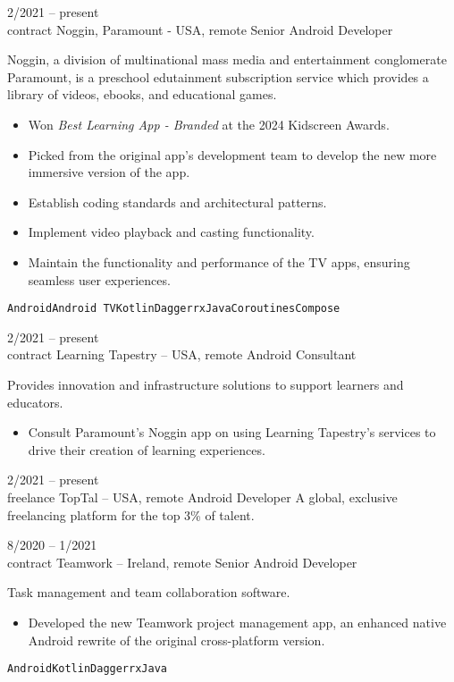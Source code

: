 \documentclass[9pt]{developercv} %
\begin{document}
\begin{entrylist}
	\entry
		{2/2021 -- present\\\footnotesize{contract}}
		{Noggin, Paramount {\normalfont\small - USA, remote}}
		{Senior Android Developer}
        {
            Noggin, a division of multinational mass media and entertainment conglomerate Paramount, is a preschool edutainment subscription service which provides a library of videos, ebooks, and educational games.
            \begin{itemize}[nosep, leftmargin=*]
                \item Won \textit{Best Learning App - Branded} at the 2024 Kidscreen Awards.
                \item Picked from the original app's development team to develop the new more immersive version of the app.
                \item Establish coding standards and architectural patterns.
                \item Implement video playback and casting functionality.
                \item Maintain the functionality and performance of the TV apps, ensuring seamless user experiences.
            \end{itemize}
            \texttt{Android}\pipesep\texttt{Android TV}\pipesep\texttt{Kotlin}\pipesep\texttt{Dagger}\pipesep\texttt{rxJava}\pipesep\texttt{Coroutines}\pipesep\texttt{Compose}
        }
        
	\entry
		{2/2021 -- present\\\footnotesize{contract}}
		{Learning Tapestry {\normalfont\small -- USA, remote}}
		{Android Consultant}
		{
            Provides innovation and infrastructure solutions to support learners and educators. 
            \begin{itemize}[nosep, leftmargin=*]
                \item Consult Paramount's Noggin app on using Learning Tapestry's services to drive their creation of learning experiences.
            \end{itemize}
        }
        
	\entry
		{2/2021 -- present\\\footnotesize{freelance}}
		{TopTal {\normalfont\small -- USA, remote}}
		{Android Developer}
		{
            A global, exclusive freelancing platform for the top 3\% of talent.
        }
        
	\entry
		{8/2020 -- 1/2021\\\footnotesize{contract}}
		{Teamwork {\normalfont\small -- Ireland, remote}}
		{Senior Android Developer}
		{
            Task management and team collaboration software.
            \begin{itemize}[nosep, leftmargin=*]
                \item Developed the new Teamwork project management app, an enhanced native Android rewrite of the original cross-platform version.
            \end{itemize} 
            \texttt{Android}\pipesep\texttt{Kotlin}\pipesep\texttt{Dagger}\pipesep\texttt{rxJava}
        }
        

\end{entrylist}
\end{document}

